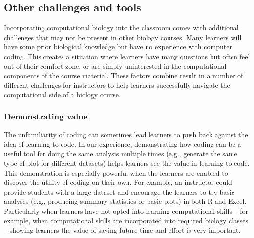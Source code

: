 

\subsection{Other challenges and tools}

Incorporating computational biology into the classroom comes with additional challenges that may not be present in other biology courses.
Many learners will have some prior biological knowledge but have no experience with computer coding.
This creates a situation where learners have many questions but often feel out of their comfort zone, or are simply uninterested in the computational components of the course material.
These factors combine result in a number of different challenges for instructors to help learners successfully navigate the computational side of a biology course.

\subsubsection{Demonstrating value}
The unfamiliarity of coding can sometimes lead learners to push back against the idea of learning to code.
In our experience, demonstrating how coding can be a useful tool for doing the same analysis multiple times (e.g., generate the same type of plot for different datasets) helps learners see the value in learning to code. 
This demonstration is especially powerful when the learners are enabled to discover the utility of coding on their own. 
For example, an instructor could provide students with a large dataset and encourage the learners to try basic analyses (e.g., producing summary statistics or basic plots) in both R and Excel. 
Particularly when learners have not opted into learning computational skills -- for example, when computational skills are incorporated into required biology classes -- showing learners the value of saving future time and effort is very important. 


